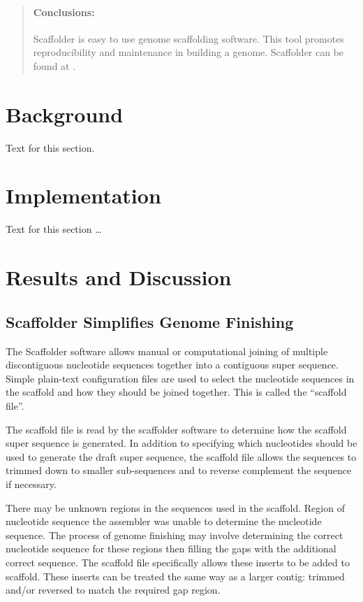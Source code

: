 \documentclass[10pt]{bmc_article}
\newenvironment{bmcformat}{\begin{raggedright}\baselineskip20pt\sloppy\setboolean{publ}{false}}{\end{raggedright}\baselineskip20pt\sloppy}
\begin{document}
\begin{bmcformat}
\begin{abstract}
  \paragraph*{Conclusions:} Scaffolder is easy to use genome scaffolding
  software. This tool promotes reproducibility and maintenance in building
  a genome. Scaffolder can be found at \scaffolder.

\end{abstract}


\section*{Background}
 Text for this section.\cite{koon,oreg,khar,zvai,xjon,schn,pond,smith,marg,hunn,advi,koha,mouse}
\section*{Implementation}
  Text for this section \ldots
\section*{Results and Discussion} %

\subsection*{Scaffolder Simplifies Genome Finishing} %

The Scaffolder software allows manual or computational joining of multiple
discontiguous nucleotide sequences together into a contiguous super sequence.
Simple plain-text configuration files are used to select the nucleotide
sequences in the scaffold and how they should be joined together. This is
called the ``scaffold file''. \pb

The scaffold file is read by the scaffolder software to determine how the
scaffold super sequence is generated. In addition to specifying which
nucleotides should be used to generate the draft super sequence, the scaffold
file allows the sequences to trimmed down to smaller sub-sequences and to
reverse complement the sequence if necessary. \pb

There may be unknown regions in the sequences used in the scaffold. Region of
nucleotide sequence the assembler was unable to determine the nucleotide
sequence. The process of genome finishing may involve determining the correct
nucleotide sequence for these regions then filling the gaps with the additional
correct sequence. The scaffold file specifically allows these inserts to be
added to scaffold. These inserts can be treated the same way as a larger
contig: trimmed and/or reversed to match the required gap region. \pb


\end{bmcformat}
\end{document}
